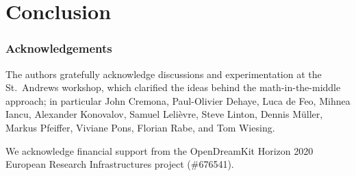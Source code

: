 \documentclass{llncs}
\begin{document}




\section{Conclusion}
\subsubsection*{Acknowledgements}
The authors gratefully acknowledge discussions and experimentation at the St.\ Andrews
workshop, which clarified the ideas behind the math-in-the-middle approach;
in particular John Cremona, Paul-Olivier Dehaye, Luca de Feo, Mihnea Iancu, Alexander
Konovalov, Samuel Leli\`evre, Steve Linton, Dennis M\"uller, Markus Pfeiffer, Viviane Pons,
Florian Rabe, and Tom Wiesing.

We acknowledge financial support from the OpenDreamKit Horizon 2020 European Research
Infrastructures project (\#676541).

\printbibliography
\end{document}
